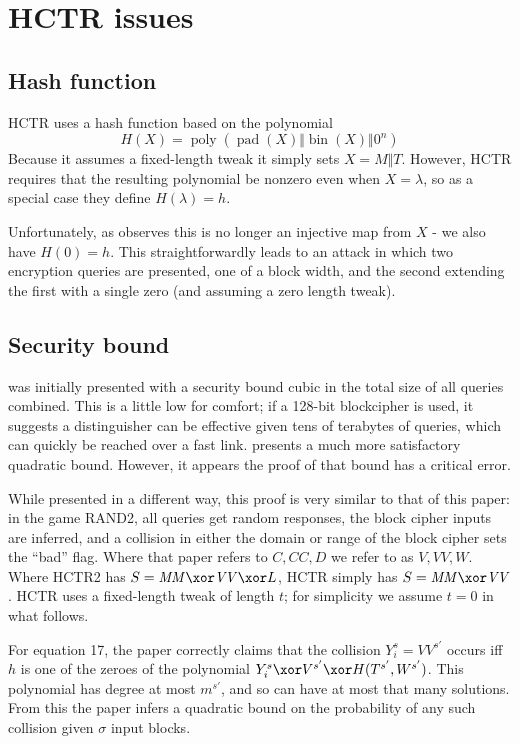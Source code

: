 \documentclass[letterpaper,11pt]{article}
\newcommand*{\Concat}{\Vert}
\newcommand*{\MM}{\mathit{MM}}
\newcommand*{\VV}{\mathit{VV}}
\DeclareMathOperator{\fromint}{bin}
\DeclareMathOperator{\pad}{pad}
\DeclareMathOperator{\poly}{poly}
\begin{document}
\section{HCTR issues}\label{hctrflaws}
\subsection{Hash function}
HCTR uses a hash function based on the polynomial
\begin{displaymath}
    H(X) = \poly(\pad(X) \Concat \fromint(X) \Concat 0^n)
\end{displaymath}
Because it assumes a fixed-length tweak it simply sets \(X = M \Concat T\).
However, HCTR requires that the resulting polynomial be nonzero
even when \(X = \lambda\), so as a special case they define
\(H(\lambda) = h\).

Unfortunately, as \cite{kumarhctr} observes this is no longer
an injective map from \(X\) - we also have \(H(0) = h\). This
straightforwardly leads to an attack in which two encryption queries
are presented, one of a block width, and the second extending
the first with a single zero (and assuming a zero length tweak).

\subsection{Security bound}
\cite{hctr} was initially presented with a security bound cubic
in the total size of all queries combined.  This is a little low
for comfort; if a 128-bit blockcipher is used, it suggests a
distinguisher can be effective given tens of terabytes of queries,
which can quickly be reached over a fast link. 
\cite{hctrquad} presents a much more satisfactory quadratic bound.
However, it appears the proof of that bound has a critical error.

While presented in a different way, this proof is very similar
to that of this paper: in the game RAND2, all queries get random
responses, the block cipher inputs are inferred, and a collision
in either the domain or range of the block cipher
sets the ``bad'' flag. Where that paper refers to 
\(C, \mathit{CC}, D\)
we refer to as \(V, VV, W\). Where HCTR2 has
\(S = \MM \xor \VV \xor L\), HCTR simply has
\(S = \MM \xor \VV\). HCTR uses a fixed-length tweak
of length \(t\); for simplicity we assume \(t = 0\)
in what follows.

For equation 17, the paper correctly claims that the collision
\(Y_i^s = VV^{s'}\) occurs iff \(h\) is one of the zeroes
of the polynomial \(Y_i^s \xor V^{s'} \xor H(T^{s'}, W^{s'})\).
This polynomial has degree at most
\(m^{s'}\), and so can have
at most that many solutions. From this the paper infers
a quadratic bound on the probability of any such collision
given \(\sigma\) input blocks.
\end{document}
